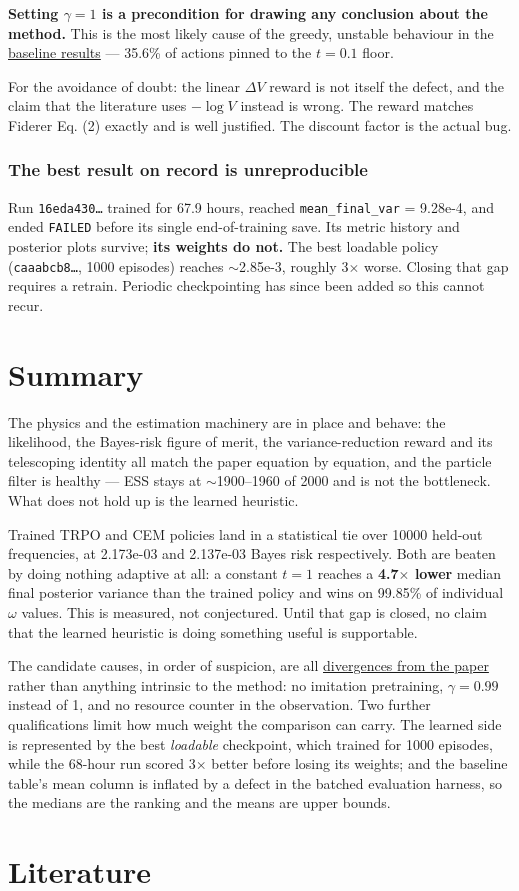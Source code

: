 \documentclass[12pt,a4paper]{article}
\begin{document}
\textbf{Setting $\gamma = 1$ is a precondition for drawing any conclusion about the method.} This is the most likely cause of the greedy, unstable behaviour in the \hyperref[sec:baseline-results]{baseline results} --- 35.6\% of actions pinned to the $t = 0.1$ floor.

For the avoidance of doubt: the linear $\Delta V$ reward is not itself the defect, and the claim that the literature uses $-\log V$ instead is wrong. The reward matches Fiderer Eq. (2) exactly and is well justified. The discount factor is the actual bug.

\subsubsection{The best result on record is unreproducible}\label{sec:7-the-best-result-in-the-repo-is-unreproducible}
Run \texttt{16eda430\ldots{}} trained for 67.9 hours, reached \texttt{mean\_\allowbreak{}final\_\allowbreak{}var} = 9.28e-4, and ended \texttt{FAILED} before its single end-of-training save. Its metric history and posterior plots survive; \textbf{its weights do not.} The best loadable policy (\texttt{caaabcb8\ldots{}}, 1000 episodes) reaches $\sim$2.85e-3, roughly 3$\times$ worse. Closing that gap requires a retrain. Periodic checkpointing has since been added so this cannot recur.

\FloatBarrier
\section{Summary}\label{sec:summary}
The physics and the estimation machinery are in place and behave: the likelihood, the Bayes-risk figure of merit, the variance-reduction reward and its telescoping identity all match the paper equation by equation, and the particle filter is healthy --- ESS stays at $\sim$1900--1960 of 2000 and is not the bottleneck. What does not hold up is the learned heuristic.

Trained TRPO and CEM policies land in a statistical tie over \num{10000} held-out frequencies, at 2.173e-03 and 2.137e-03 Bayes risk respectively. Both are beaten by doing nothing adaptive at all: a constant $t = 1$ reaches a \textbf{4.7$\times$ lower} median final posterior variance than the trained policy and wins on 99.85\% of individual $\omega$ values. This is measured, not conjectured. Until that gap is closed, no claim that the learned heuristic is doing something useful is supportable.

The candidate causes, in order of suspicion, are all \hyperref[sec:divergences-from-fiderer-et-al]{divergences from the paper} rather than anything intrinsic to the method: no imitation pretraining, $\gamma = 0.99$ instead of 1, and no resource counter in the observation. Two further qualifications limit how much weight the comparison can carry. The learned side is represented by the best \emph{loadable} checkpoint, which trained for 1000 episodes, while the 68-hour run scored 3$\times$ better before losing its weights; and the baseline table's mean column is inflated by a defect in the batched evaluation harness, so the medians are the ranking and the means are upper bounds.

\FloatBarrier
\section{Literature}\label{sec:literature}
\end{document}
